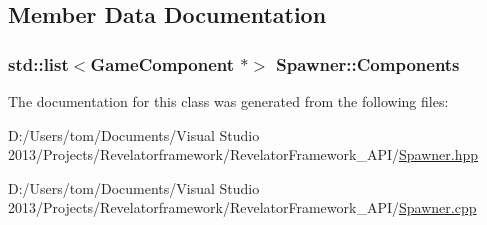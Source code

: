 \subsection{Member Data Documentation}
\hypertarget{class_spawner_ae5e316957ac1574347ba80bac3866976}{
\subsubsection[{Components}]{\setlength{\rightskip}{0pt plus 5cm}std\-::list$<${\bf Game\-Component} $\ast$$>$ Spawner\-::\-Components\hspace{0.3cm}{\ttfamily [private]}}}\label{class_spawner_ae5e316957ac1574347ba80bac3866976}


The documentation for this class was generated from the following files\-:\begin{DoxyCompactItemize}
\item 
D\-:/\-Users/tom/\-Documents/\-Visual Studio 2013/\-Projects/\-Revelatorframework/\-Revelator\-Framework\-\_\-\-A\-P\-I/\hyperlink{_spawner_8hpp}{Spawner.\-hpp}\item 
D\-:/\-Users/tom/\-Documents/\-Visual Studio 2013/\-Projects/\-Revelatorframework/\-Revelator\-Framework\-\_\-\-A\-P\-I/\hyperlink{_spawner_8cpp}{Spawner.\-cpp}\end{DoxyCompactItemize}
